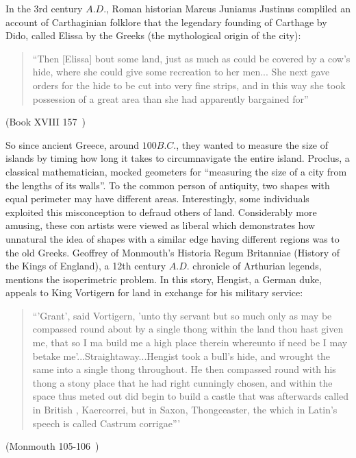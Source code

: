 \documentclass[a4paper]{book}
\begin{document}
In the 3rd century $A.D.$, Roman historian Marcus Junianus Justinus compliled an account of Carthaginian folklore that the legendary founding of Carthage by Dido, called Elissa by the Greeks (the mythological origin of the city):
\begin{center}
    \begin{quote}
        ``Then [Elissa] bout some land, just as much as could be covered by a cow's hide, where she could give some recreation to her men... She next gave orders for the hide to be cut into very fine strips, and in this way she took possession of a great area than she had apparently bargained for''
    \end{quote}
    (Book XVIII 157~\cite{yardley1994justin})
\end{center}

So since ancient Greece, around $100B.C.$, they wanted to measure the size of islands by timing how long it takes to circumnavigate the entire island. Proclus, a classical mathematician, mocked geometers for ``measuring the size of a city from the lengths of its walls''. To the common person of antiquity, two shapes with equal perimeter may have different areas. Interestingly, some individuals exploited this misconception to defraud others of land. Considerably more amusing, these con artists were viewed as liberal which demonstrates how unnatural the idea of shapes with a similar edge having different regions was to the old Greeks.
\newline
\newline
Geoffrey of Monmouth's Historia Regum Britanniae (History of the Kings of England), a 12th century $A.D.$ chronicle of Arthurian legends, mentions the isoperimetric problem. In this story, Hengist, a German duke, appeals to King Vortigern for land in exchange for his military service:
\begin{center}
    \begin{quote}
        ``'Grant', said Vortigern, 'unto thy servant but so much only as may be compassed round about by a single thong within the land thou hast given me, that so I ma build me a high place therein whereunto if need be I may betake me’...Straightaway...Hengist took a bull’s hide, and wrought the same into a single thong throughout. He then compassed round with his thong a stony place that he had right cunningly chosen, and within the space thus meted out did begin to build a castle that was afterwards called in British , Kaercorrei, but in Saxon, Thongceaster, the which in Latin’s speech is called Castrum corrigae'''
    \end{quote}
    (Monmouth 105-106~\cite{evans1920histories})
\end{center}
\end{document}
